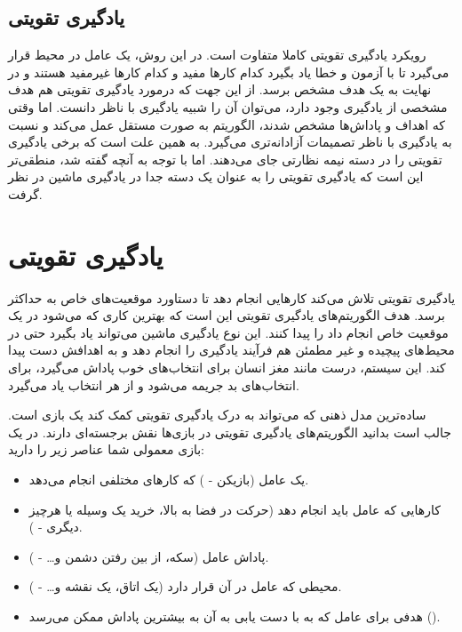 \documentclass[12pt]{report}
\begin{document}
\subsection{یادگیری تقویتی }
رویکرد یادگیری تقویتی کاملا متفاوت است. در این روش، یک عامل در محیط قرار می‌گیرد تا با آزمون و خطا یاد بگیرد کدام کارها مفید و کدام کارها غیرمفید هستند و در نهایت به یک هدف مشخص برسد. از این جهت که درمورد یادگیری تقویتی هم هدف مشخصی از یادگیری وجود دارد، می‌توان آن را شبیه یادگیری با ناظر دانست. اما وقتی که اهداف و پاداش‌ها مشخص شدند، الگوریتم به صورت مستقل عمل می‌کند و نسبت به یادگیری با ناظر تصمیمات آزادانه‌تری می‌گیرد. به همین علت است که برخی یادگیری تقویتی را در دسته نیمه نظارتی جای می‌دهند. اما با توجه به آنچه گفته شد، منطقی‌تر این است که یادگیری تقویتی را به عنوان یک دسته جدا در یادگیری ماشین در نظر گرفت.

\section{یادگیری تقویتی}
یادگیری تقویتی تلاش می‌کند کارهایی انجام دهد تا دستاورد موقعیت‌های خاص به حداکثر برسد. هدف الگوریتم‌های یادگیری تقویتی این است که بهترین کاری که می‌شود در یک موقعیت خاص انجام داد را پیدا کنند. این نوع یادگیری ماشین می‌تواند یاد بگیرد حتی در محیط‌های پیچیده و غیر مطمئن هم فرآیند یادگیری را انجام دهد و به اهدافش دست پیدا کند. این سیستم، درست مانند مغز انسان برای انتخاب‌های خوب پاداش می‌گیرد، برای انتخاب‌های بد جریمه می‌شود و از هر انتخاب یاد می‌گیرد.

ساده‌ترین مدل ذهنی‌ که می‌تواند به درک یادگیری تقویتی کمک کند یک بازی است. جالب است بدانید الگوریتم‌های یادگیری تقویتی در بازی‌ها نقش برجسته‌ای دارند. در یک بازی معمولی شما عناصر زیر را دارید:

\begin{itemize}
    \item یک عامل (بازیکن - \textbf{}) که کارهای مختلفی انجام می‌دهد.
    \item کارهایی که عامل باید انجام دهد (حرکت در فضا به بالا، خرید یک وسیله یا هرچیز دیگری - \textbf{}).
    \item پاداش عامل (سکه، از بین رفتن دشمن و… - \textbf{}).
    \item محیطی که عامل در آن قرار دارد (یک اتاق، یک نقشه و… - \textbf{}).
    \item هدفی برای عامل که به با دست یابی به آن به بیشترین پاداش ممکن می‌رسد (\textbf{}).
\end{itemize}
\end{document}
